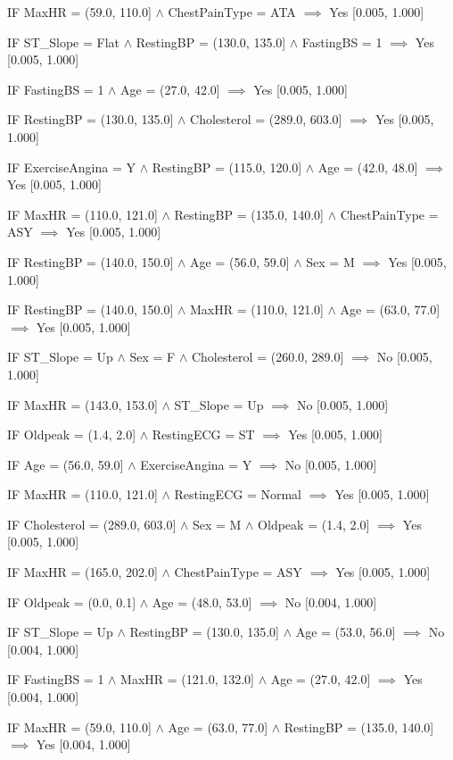 IF MaxHR = (59.0, 110.0] $\land$ ChestPainType = ATA $\implies$ Yes [0.005, 1.000]

IF ST_Slope = Flat $\land$ RestingBP = (130.0, 135.0] $\land$ FastingBS = 1 $\implies$ Yes [0.005, 1.000]

IF FastingBS = 1 $\land$ Age = (27.0, 42.0] $\implies$ Yes [0.005, 1.000]

IF RestingBP = (130.0, 135.0] $\land$ Cholesterol = (289.0, 603.0] $\implies$ Yes [0.005, 1.000]

IF ExerciseAngina = Y $\land$ RestingBP = (115.0, 120.0] $\land$ Age = (42.0, 48.0] $\implies$ Yes [0.005, 1.000]

IF MaxHR = (110.0, 121.0] $\land$ RestingBP = (135.0, 140.0] $\land$ ChestPainType = ASY $\implies$ Yes [0.005, 1.000]

IF RestingBP = (140.0, 150.0] $\land$ Age = (56.0, 59.0] $\land$ Sex = M $\implies$ Yes [0.005, 1.000]

IF RestingBP = (140.0, 150.0] $\land$ MaxHR = (110.0, 121.0] $\land$ Age = (63.0, 77.0] $\implies$ Yes [0.005, 1.000]

IF ST_Slope = Up $\land$ Sex = F $\land$ Cholesterol = (260.0, 289.0] $\implies$ No [0.005, 1.000]

IF MaxHR = (143.0, 153.0] $\land$ ST_Slope = Up $\implies$ No [0.005, 1.000]

IF Oldpeak = (1.4, 2.0] $\land$ RestingECG = ST $\implies$ Yes [0.005, 1.000]

IF Age = (56.0, 59.0] $\land$ ExerciseAngina = Y $\implies$ No [0.005, 1.000]

IF MaxHR = (110.0, 121.0] $\land$ RestingECG = Normal $\implies$ Yes [0.005, 1.000]

IF Cholesterol = (289.0, 603.0] $\land$ Sex = M $\land$ Oldpeak = (1.4, 2.0] $\implies$ Yes [0.005, 1.000]

IF MaxHR = (165.0, 202.0] $\land$ ChestPainType = ASY $\implies$ Yes [0.005, 1.000]

IF Oldpeak = (0.0, 0.1] $\land$ Age = (48.0, 53.0] $\implies$ No [0.004, 1.000]

IF ST_Slope = Up $\land$ RestingBP = (130.0, 135.0] $\land$ Age = (53.0, 56.0] $\implies$ No [0.004, 1.000]

IF FastingBS = 1 $\land$ MaxHR = (121.0, 132.0] $\land$ Age = (27.0, 42.0] $\implies$ Yes [0.004, 1.000]

IF MaxHR = (59.0, 110.0] $\land$ Age = (63.0, 77.0] $\land$ RestingBP = (135.0, 140.0] $\implies$ Yes [0.004, 1.000]

